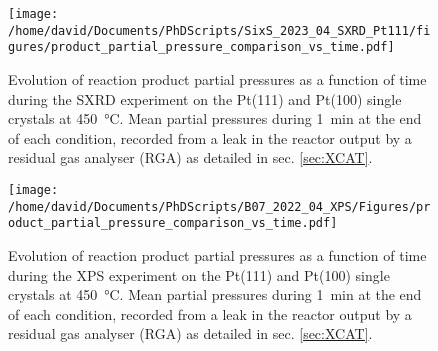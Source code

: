 \begin{figure}[!htb]
    \centering
    \texttt{[image: /home/david/Documents/PhDScripts/SixS\_2023\_04\_SXRD\_Pt111/figures/product\_partial\_pressure\_comparison\_vs\_time.pdf]}
    \caption{
        Evolution of reaction product partial pressures as a function of time during the SXRD experiment on the Pt(111) and Pt(100) single crystals at \qty{450}{\degreeCelsius}.
        Mean partial pressures during \qty{1}{\minute} at the end of each condition, recorded from a leak in the reactor output by a residual gas analyser (RGA) as detailed in sec. \ref{sec:XCAT}.
    }
    \label{fig:RGA450SXRDPt111AndPt100Time}
\end{figure}

\begin{figure}[!htb]
    \centering
    \texttt{[image: /home/david/Documents/PhDScripts/B07\_2022\_04\_XPS/Figures/product\_partial\_pressure\_comparison\_vs\_time.pdf]}
    \caption{
        Evolution of reaction product partial pressures as a function of time during the XPS experiment on the Pt(111) and Pt(100) single crystals at \qty{450}{\degreeCelsius}.
        Mean partial pressures during \qty{1}{\minute} at the end of each condition, recorded from a leak in the reactor output by a residual gas analyser (RGA) as detailed in sec. \ref{sec:XCAT}.
    }
    \label{fig:RGA450XPSPt111AndPt100Time}
\end{figure}

